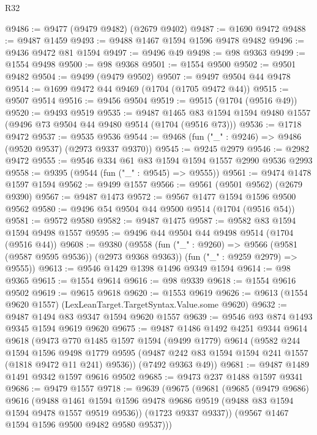 \begin{lexlean}{R32}
\begin{coremodule}
@9486 := @9477 (@9479 @9482) (@2679 @9402)
@9487 := @1690 @9472
@9488 := @9487 @1459
@9493 := @9488 @1467 @1594 @1596 @9478 @9482
@9496 := @9436 @9472 @81 @1594
@9497 := @9496 @49
@9498 := @98 @9363
@9499 := @1554 @9498
@9500 := @98 @9368
@9501 := @1554 @9500
@9502 := @9501 @9482
@9504 := @9499 (@9479 @9502)
@9507 := @9497 @9504 @44 @9478
@9514 := @1699 @9472 @44 @9469 (@1704 (@1705 @9472 @44))
@9515 := @9507 @9514
@9516 := @9456 @9504
@9519 := @9515 (@1704 (@9516 @49))
@9520 := @9493 @9519
@9535 := @9487
    @1465
    @83
    @1594
    @1594
    @9480
    @1557
    (@9496 @73 @9504 @44 @9480 @9514 (@1704 (@9516 @73)))
@9536 := @1718 @9472
@9537 := @9535 @9536
@9544 := @9468 (fun ("_" : @9246) => @9486 (@9520 @9537) (@2973 @9337 @9370))
@9545 := @9245 @2979
@9546 := @2982 @9472
@9555 := @9546 @334 @61 @83 @1594 @1594 @1557 @2990 @9536 @2993
@9558 := @9395 (@9544 (fun ("_" : @9545) => @9555))
@9561 := @9474 @1478 @1597 @1594
@9562 := @9499 @1557
@9566 := @9561 (@9501 @9562) (@2679 @9390)
@9567 := @9487 @1473
@9572 := @9567 @1477 @1594 @1596 @9500 @9562
@9580 := @9496 @54 @9504 @44 @9500 @9514 (@1704 (@9516 @54))
@9581 := @9572 @9580
@9582 := @9487 @1475
@9587 := @9582 @83 @1594 @1594 @9498 @1557
@9595 := @9496 @44 @9504 @44 @9498 @9514 (@1704 (@9516 @44))
@9608 := @9380
    (@9558
      (fun ("_" : @9260) => @9566 (@9581 (@9587 @9595 @9536)) (@2973 @9368 @9363))
      (fun ("_" : @9259 @2979) => @9555))
@9613 := @9546 @1429 @1398 @1496 @9349 @1594
@9614 := @98 @9365
@9615 := @1554 @9614
@9616 := @98 @9339
@9618 := @1554 @9616 @9502
@9619 := @9615 @9618
@9620 := @1553 @9619
@9626 := @9613 (@1554 @9620 @1557) (LexLeanTarget.TargetSyntax.Value.some @9620)
@9632 := @9487 @1494 @83 @9347 @1594 @9620 @1557
@9639 := @9546 @93 @874 @1493 @9345 @1594 @9619 @9620
@9675 := @9487
    @1486
    @1492
    @4251
    @9344
    @9614
    @9618
    (@9473
      @770
      @1485
      @1597
      @1594
      (@9499 @1779)
      @9614
      (@9582
        @244
        @1594
        @1596
        @9498
        @1779
        @9595
        (@9487 @242 @83 @1594 @1594 @241 @1557 (@1818 @9472 @11 @241) @9536))
      (@7492 @9363 @49))
@9681 := @9487 @1489 @1491 @9342 @1597 @9616 @9502
@9685 := @9473 @237 @1488 @1597 @9341
@9686 := @9479 @1557
@9718 := @9639
    (@9675
      (@9681
        (@9685
          (@9479 @9686)
          @9616
          (@9488
            @1461
            @1594
            @1596
            @9478
            @9686
            @9519
            (@9488 @83 @1594 @1594 @9478 @1557 @9519 @9536))
          (@1723 @9337 @9337))
        (@9567 @1467 @1594 @1596 @9500 @9482 @9580 @9537)))

\end{coremodule}
\end{lexlean}
